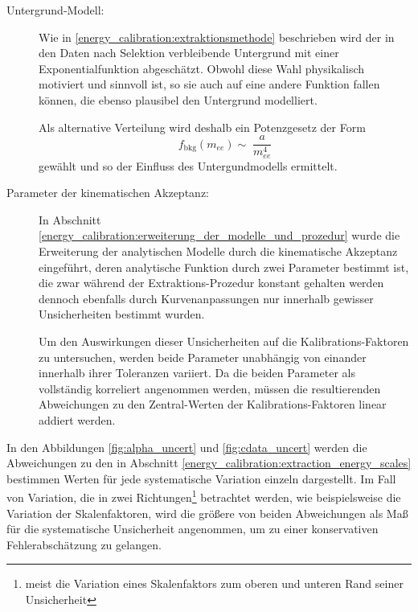 \begin{description}
    \item[Untergrund-Modell:]
        Wie in \ref{energy_calibration:extraktionsmethode} beschrieben wird der
        in den Daten nach Selektion verbleibende Untergrund mit einer
        Exponentialfunktion abgeschätzt. Obwohl diese Wahl physikalisch
        motiviert und sinnvoll ist, so sie auch auf eine andere Funktion fallen
        können, die ebenso plausibel den Untergrund modelliert.

        Als alternative Verteilung wird deshalb ein Potenzgesetz der Form
        \[
            f_\text{bkg}(m_{ee}) \sim\;\frac{a}{m_{ee}^4}
        \]
        gewählt und so der Einfluss des Untergundmodells ermittelt.

    \item[Parameter der kinematischen Akzeptanz:]
        In Abschnitt
        \ref{energy_calibration:erweiterung_der_modelle_und_prozedur} wurde die
        Erweiterung der analytischen Modelle durch die kinematische Akzeptanz
        eingeführt, deren analytische Funktion durch zwei Parameter bestimmt
        ist, die zwar während der Extraktions-Prozedur konstant gehalten werden
        dennoch ebenfalls durch Kurvenanpassungen nur innerhalb gewisser
        Unsicherheiten bestimmt wurden.

        Um den Auswirkungen dieser Unsicherheiten auf die Kalibrations-Faktoren
        zu untersuchen, werden beide Parameter unabhängig von einander
        innerhalb ihrer Toleranzen variiert. Da die beiden Parameter als
        vollständig korreliert angenommen werden, müssen die resultierenden
        Abweichungen zu den Zentral-Werten der Kalibrations-Faktoren linear
        addiert werden.
\end{description}

In den Abbildungen \ref{fig:alpha_uncert} und \ref{fig:cdata_uncert} werden die
Abweichungen zu den in Abschnitt
\ref{energy_calibration:extraction_energy_scales} bestimmen Werten für jede
systematische Variation einzeln dargestellt. Im Fall von Variation, die in
zwei Richtungen\footnote{meist die Variation eines Skalenfaktors zum oberen und
unteren Rand seiner Unsicherheit} betrachtet werden, wie beispielsweise die
Variation der Skalenfaktoren, wird die größere von beiden Abweichungen als Maß
für die systematische Unsicherheit angenommen, um zu einer konservativen
Fehlerabschätzung zu gelangen.

